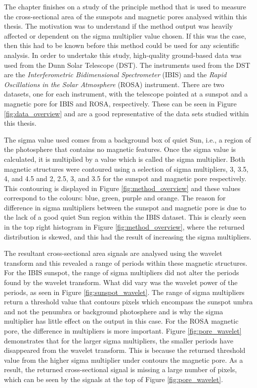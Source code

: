     The chapter finishes on a study of the principle method that is used to measure the cross-sectional area of the sunspots and magnetic pores analysed within this thesis.
    The motivation was to understand if the method output was heavily affected or dependent on the sigma multiplier value chosen.
    If this was the case, then this had to be known before this method could be used for any scientific analysis.    
    In order to undertake this study, high-quality ground-based data was used from the Dunn Solar Telescope (DST).
    The instruments used from the DST are the \textit{Interferometric Bidimensional Spectrometer} (IBIS) and the \textit{Rapid Oscillations in the Solar Atmosphere} (ROSA) instrument.
    There are two datasets, one for each instrument, with the telescope pointed at a sunspot and a magnetic pore for IBIS and ROSA, respectively.
    These can be seen in Figure \ref{fig:data_overview} and are a good representative of the data sets studied within this thesis.
    
    The sigma value used comes from a background box of quiet Sun, i.e., a region of the photosphere that contains no magnetic features.
    Once the sigma value is calculated, it is multiplied by a value which is called the sigma multiplier.  
    Both magnetic structures were contoured using a selection of sigma multipliers, 3, 3.5, 4, and 4.5 and 2, 2.5, 3, and 3.5 for the sunspot and magnetic pore respectively.
    This contouring is displayed in Figure \ref{fig:method_overview} and these values correspond to the colours: blue, green, purple and orange.
    The reason for difference in sigma multipliers between the sunspot and magnetic pore is due to the lack of a good quiet Sun region within the IBIS dataset.
    This is clearly seen in the top right histogram in Figure \ref{fig:method_overview}, where the returned distribution is skewed, and this had the result of increasing the sigma multipliers.
    
    The resultant cross-sectional area signals are analysed using the wavelet transform and this revealed a range of periods within these magnetic structures.
    For the IBIS sunspot, the range of sigma multipliers did not alter the periods found by the wavelet transform.
    What did vary was the wavelet power of the periods, as seen in Figure \ref{fig:sunspot_wavelet}. 
    The range of sigma multipliers return a threshold value that contours pixels which encompass the sunspot umbra and not the penumbra or background photosphere and is why the sigma multiplier has little effect on the output in this case.
    For the ROSA magnetic pore, the difference in multipliers is more important.
    Figure \ref{fig:pore_wavelet} demonstrates that for the larger sigma multipliers, the smaller periods have disappeared from the wavelet transform. 
    This is because the returned threshold value from the higher sigma multiplier under contours the magnetic pore.
    As a result, the returned cross-sectional signal is missing a large number of pixels, which can be seen by the signals at the top of Figure \ref{fig:pore_wavelet}.
  
